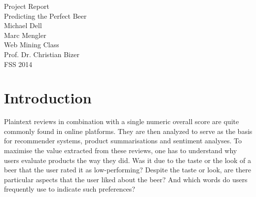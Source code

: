 \documentclass[11pt,titlepage,oneside,openany]{book}
\begin{document}
\begin{titlepage}
	\vspace*{2cm}
  \begin{center}
   {\Large Project Report\\}
   \vspace{1cm} 
   {Predicting the Perfect Beer\\}
   \vspace{2cm}
   {    Michael Dell\\
    Marc Mengler\\
   }
   \vspace{2.5cm}
   {Web Mining Class} \\
   {Prof. Dr. Christian Bizer}\\
   {FSS 2014}
  \end{center}
\end{titlepage} 

\tableofcontents
\newpage





\newpage





\chapter{Introduction}
\label{cha:intro}


Plaintext reviews in combination with a single numeric overall score are quite commonly found in online platforms. They are then analyzed to serve as the basis for recommender systems, product summarisations and sentiment analyses. To maximise the value extracted from these reviews, one has to understand why users evaluate products the way they did. Was it due to the taste or the look of a beer that the user rated it as low-performing? Despite the taste or look, are there particular aspects that the user liked about the beer? And which words do users frequently use to indicate such preferences?
\end{document}
